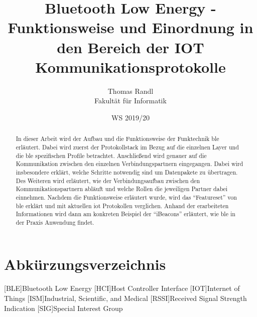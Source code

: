 \documentclass[twoside=true, %
    DIV=15
    ,%
    BCOR=15mm, %
    headinclude=true,
    footinclude=false,
    pagesize,%
    fontsize=12pt,%
    paper=a4,%
    numbers=noenddot
  ]{scrartcl}
\begin{document}
\def\figdir{figures}
\def\tabledir{tables}

\titlehead{
\raggedleft
\texttt{[image: \\figdir/logo-th-rosenheim-2019\_master\_quer\_2c.eps]}
}

\title{
\vspace*{0cm}
Bluetooth Low Energy - Funktionsweise und Einordnung in den Bereich der IOT Kommunikationsprotokolle
}

\author{
Thomas Randl\\
Fakultät für Informatik}

\date{WS 2019/20}

\maketitle

\begin{abstract}
In dieser Arbeit wird der Aufbau und die Funktionsweise der Funktechnik \ac{ble} erläutert. Dabei wird zuerst der Protokollstack im Bezug auf die einzelnen Layer und die \ac{ble} spezifischen Profile betrachtet. Anschließend wird genauer auf die Kommunikation zwischen den einzelnen Verbindungspartnern eingegangen. Dabei wird insbesondere erklärt, welche Schritte notwendig sind um Datenpakete zu übertragen. Des Weiteren wird erläutert, wie der Verbindungsaufbau zwischen den Kommunikationspartnern abläuft und welche Rollen die jeweiligen Partner dabei einnehmen. Nachdem die Funktionsweise erläutert wurde, wird das "`Featureset"' von \ac{ble} erklärt und mit aktuellen \ac{iot} Protokollen verglichen. Anhand der erarbeiteten Informationen wird dann am konkreten Beispiel der "`iBeacons"' erläutert, wie \ac{ble} in der Praxis Anwendung findet.
\end{abstract}

\newpage

\tableofcontents

\newpage

\section*{Abkürzungsverzeichnis} %
\begin{acronym}[ECUAF]
	[BLE]{Bluetooth Low Energy}
	[HCI]{Host Controller Interface}
	[IOT]{Internet of Things}
	[ISM]{Industrial, Scientific, and Medical}
	[RSSI]{Received Signal Strength Indication}
	[SIG]{Special Interest Group}
\end{acronym}









\appendix





\end{document}
